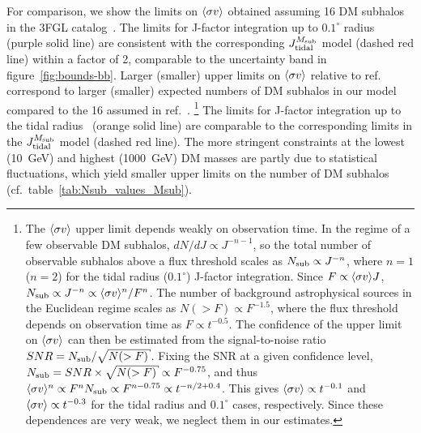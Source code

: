 For comparison, we show the limits on $\langle \sigma v \rangle$ obtained assuming 16 DM subhalos in the 3FGL catalog~\cite{2019JCAP...07..020C}.
The limits for J-factor integration up
to $0.1^\circ$ radius~\cite{2019Galax...7...90C} (purple solid line) are consistent with the corresponding
$J_{\rm tidal}^{M_{\rm sub}}$ model (dashed red line) within a factor of 2, comparable to the uncertainty band in figure~\ref{fig:bounds-bb}.
Larger (smaller) upper limits on $\langle \sigma v \rangle$ relative to ref.~\cite{2019Galax...7...90C} correspond to larger (smaller) expected numbers of DM subhalos in our model compared to the 16 assumed in ref.~\cite{2019Galax...7...90C}.%
\footnote{
The $\langle \sigma v \rangle$ upper limit depends weakly on observation time.
In the regime of a few observable DM subhalos, $dN/dJ \propto J^{-n - 1}$, so the total number of observable subhalos above a flux threshold scales as $N_{\rm sub} \propto J^{-n}$,
where $n = 1$ ($n = 2$) for the tidal radius ($0.1^\circ$) J-factor integration.
Since $F \propto \langle \sigma v \rangle J$,
$N_{\rm sub} \propto J^{-n} \propto \langle \sigma v \rangle^n / F^n$.
The number of background astrophysical sources in the Euclidean regime scales as
$N(> F) \propto F^{-1.5}$, where the flux threshold depends on observation time as $F \propto t^{-0.5}$.
The confidence of the upper limit on $\langle \sigma v \rangle$
can then be estimated from the signal-to-noise ratio
$SNR = N_{\rm sub} / \sqrt{N(> F)}$.
Fixing the SNR at a given confidence level, $N_{\rm sub} = SNR \times \sqrt{N(> F)} \propto F^{-0.75}$,
and thus $\langle \sigma v \rangle^n \propto F^n N_{\rm sub} \propto F^{n - 0.75} \propto t^{-n/2 + 0.4}$.
This gives $\langle \sigma v \rangle \propto t^{-0.1}$ and $\langle \sigma v \rangle \propto t^{-0.3}$ for the tidal radius and $0.1^\circ$ cases, respectively. Since these dependences are very weak, we neglect them in our estimates.

}
The limits for J-factor integration
up to the tidal radius~\cite{2019JCAP...07..020C} (orange solid line) are comparable to the corresponding limits in the
$J_{\rm tidal}^{M_{\rm sub}}$ model (dashed red line).
The more stringent constraints at the lowest (10~GeV) and highest (1000~GeV) DM masses are partly due to statistical fluctuations, which yield smaller upper limits on the number of DM subhalos (cf.\ table~\ref{tab:Nsub_values_Msub}).


